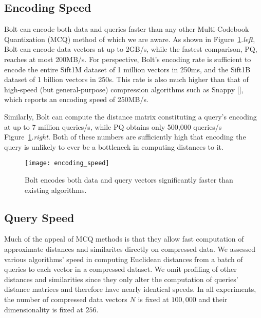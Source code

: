 \subsection{Encoding Speed}

Bolt can encode both data and queries faster than any other Multi-Codebook Quantization (MCQ) method of which we are aware. As shown in Figure~\ref{fig:encoding_speeds}.\textit{left}, Bolt can encode data vectors at up to 2GB/s, while the fastest comparison, PQ, reaches at most 200MB/s. For perspective, Bolt's encoding rate is sufficient to encode the entire Sift1M dataset of 1 million vectors in 250ms, and the Sift1B dataset of 1 billion vectors in 250s. This rate is also much higher than that of high-speed (but general-purpose) compression algorithms such as Snappy [], which reports an encoding speed of 250MB/s.

Similarly, Bolt can compute the distance matrix constituting a query's encoding at up to 7 million queries/s, while PQ obtains only 500,000 queries/s Figure~\ref{fig:encoding_speeds}.\textit{right}. Both of these numbers are sufficiently high that encoding the query is unlikely to ever be a bottleneck in computing distances to it.

\begin{figure}[h]
\begin{center}
\label{fig:encoding_speeds}
\texttt{[image: encoding\_speed]}
\vspace*{-1mm}
\caption{Bolt encodes both data and query vectors significantly faster than existing algorithms.}
\end{center}
\end{figure}



\subsection{Query Speed}

Much of the appeal of MCQ methods is that they allow fast computation of approximate distances and similarites directly on compressed data. We assessed various algorithms' speed in computing Euclidean distances from a batch of queries to each vector in a compressed dataset. We omit profiling of other distances and similarities since they only alter the computation of queries' distance matrices and therefore have nearly identical speeds. In all experiments, the number of compressed data vectors $N$ is fixed at $100,000$ and their dimensionality is fixed at $256$.

